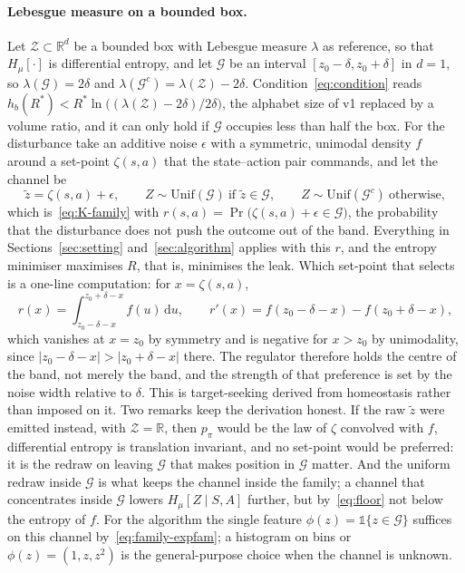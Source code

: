 \documentclass[11pt]{article}
\theoremstyle{remark}
\newcommand{\Zcal}{\mathcal Z}
\newcommand{\Gcal}{\mathcal G}
\newcommand{\1}{\mathds{1}}
\newcommand{\dd}{\mathrm d}
\newcommand{\pz}{p_{\pi}}
\newcommand{\Hf}[1]{H_{\mu}\!\left[#1\right]}
\newcommand{\new}[1]{\textcolor{blue!70!black}{#1}}
\begin{document}
\paragraph{\new{Lebesgue measure on a bounded box.}}
{\color{blue!70!black}
Let $\Zcal\subset\mathbb R^d$ be a bounded box with Lebesgue measure $\lambda$ as reference, so that $\Hf{\cdot}$ is differential entropy, and let $\Gcal$ be an interval $[z_0-\delta,z_0+\delta]$ in $d=1$, so $\lambda(\Gcal)=2\delta$ and $\lambda(\Gcal^c)=\lambda(\Zcal)-2\delta$.
Condition~\eqref{eq:condition} reads $h_b(R^\ast)<R^\ast\ln\big((\lambda(\Zcal)-2\delta)/2\delta\big)$, the alphabet size of v1 replaced by a volume ratio, and it can only hold if $\Gcal$ occupies less than half the box.
For the disturbance take an additive noise $\epsilon$ with a symmetric, unimodal density $f$ around a set-point $\zeta(s,a)$ that the state--action pair commands, and let the channel be
\begin{equation}
  \tilde z=\zeta(s,a)+\epsilon,
  \qquad
  Z\sim\mathrm{Unif}(\Gcal)\ \text{if }\tilde z\in \Gcal,
  \qquad
  Z\sim\mathrm{Unif}(\Gcal^c)\ \text{otherwise},
  \label{eq:leak-channel}
\end{equation}
which is~\eqref{eq:K-family} with $r(s,a)=\Pr\big(\zeta(s,a)+\epsilon\in \Gcal\big)$, the probability that the disturbance does not push the outcome out of the band.
Everything in Sections~\ref{sec:setting} and~\ref{sec:algorithm} applies with this $r$, and the entropy minimiser maximises $R$, that is, minimises the leak.
Which set-point that selects is a one-line computation: for $x=\zeta(s,a)$,
\begin{equation}
  r(x)=\int_{z_0-\delta-x}^{z_0+\delta-x}f(u)\,\dd u,
  \qquad
  r'(x)=f(z_0-\delta-x)-f(z_0+\delta-x),
  \label{eq:leak-derivative}
\end{equation}
which vanishes at $x=z_0$ by symmetry and is negative for $x>z_0$ by unimodality, since $|z_0-\delta-x|>|z_0+\delta-x|$ there.
The regulator therefore holds the centre of the band, not merely the band, and the strength of that preference is set by the noise width relative to $\delta$.
This is target-seeking derived from homeostasis rather than imposed on it.
Two remarks keep the derivation honest.
If the raw $\tilde z$ were emitted instead, with $\Zcal=\mathbb R$, then $\pz$ would be the law of $\zeta$ convolved with $f$, differential entropy is translation invariant, and no set-point would be preferred: it is the redraw on leaving $\Gcal$ that makes position in $\Gcal$ matter.
And the uniform redraw inside $\Gcal$ is what keeps the channel inside the family; a channel that concentrates inside $\Gcal$ lowers $\Hf{Z\mid S,A}$ further, but by~\eqref{eq:floor} not below the entropy of $f$.
For the algorithm the single feature $\phi(z)=\1\{z\in \Gcal\}$ suffices on this channel by~\eqref{eq:family-expfam}; a histogram on bins or $\phi(z)=(1,z,z^2)$ is the general-purpose choice when the channel is unknown.
}
\end{document}

